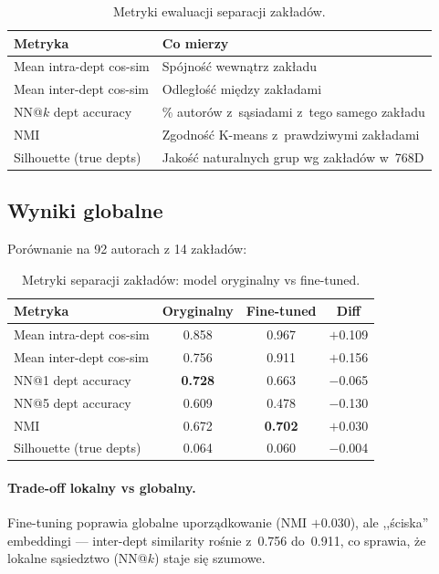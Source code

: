 \documentclass[a4paper,11pt]{article}
\begin{document}
\begin{table}[H]
\centering
\caption{Metryki ewaluacji separacji zakładów.}
\begin{tabular}{lp{8cm}}
\toprule
Metryka & Co mierzy \\
\midrule
Mean intra-dept cos-sim & Spójność wewnątrz zakładu \\
Mean inter-dept cos-sim & Odległość między zakładami \\
NN@$k$ dept accuracy & \% autorów z~sąsiadami z~tego samego zakładu \\
NMI & Zgodność K-means z~prawdziwymi zakładami \\
Silhouette (true depts) & Jakość naturalnych grup wg zakładów w~768D \\
\bottomrule
\end{tabular}
\end{table}

\subsection{Wyniki globalne}

Porównanie na 92 autorach z 14 zakładów:

\begin{table}[H]
\centering
\caption{Metryki separacji zakładów: model oryginalny vs fine-tuned.}
\label{tab:dept_global}
\begin{tabular}{lccc}
\toprule
Metryka & Oryginalny & Fine-tuned & Diff \\
\midrule
Mean intra-dept cos-sim & 0.858 & 0.967 & $+$0.109 \\
Mean inter-dept cos-sim & 0.756 & 0.911 & $+$0.156 \\
NN@1 dept accuracy & \textbf{0.728} & 0.663 & $-$0.065 \\
NN@5 dept accuracy & 0.609 & 0.478 & $-$0.130 \\
NMI & 0.672 & \textbf{0.702} & $+$0.030 \\
Silhouette (true depts) & 0.064 & 0.060 & $-$0.004 \\
\bottomrule
\end{tabular}
\end{table}

\paragraph{Trade-off lokalny vs globalny.}
Fine-tuning poprawia globalne uporządkowanie (NMI $+$0.030), ale ,,ściska'' embeddingi --- inter-dept similarity rośnie z~0.756 do~0.911, co sprawia, że lokalne sąsiedztwo (NN@$k$) staje się szumowe.
\end{document}
